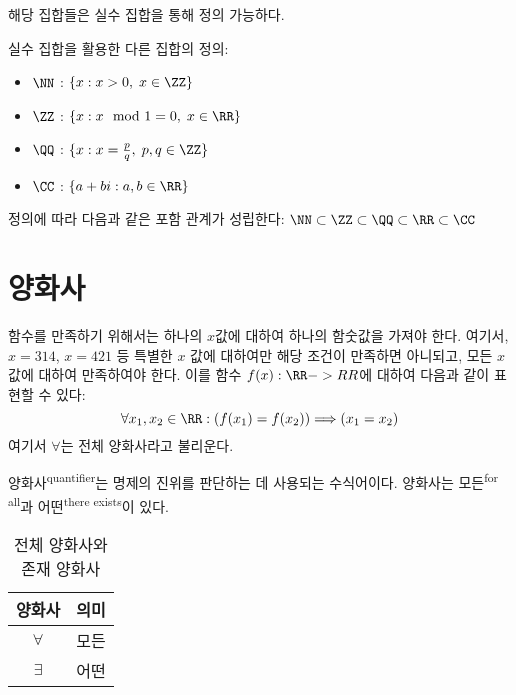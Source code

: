 \documentclass[../note.tex]{subfiles}
\begin{document}
해당 집합들은 실수 집합을 통해 정의 가능하다.

\begin{definition}
  실수 집합을 활용한 다른 집합의 정의:
  \begin{itemize}
    \item
      $\NN$ : $\{x : x > 0,\; x \in \ZZ\}$
    \item
      $\ZZ$ : $\{x : x \mod 1 = 0,\; x \in \RR\}$
    \item
      $\QQ$ : $\{x : x = \frac{p}{q},\; p, q \in \ZZ\}$
    \item
      $\CC$ : $\{a+bi : a, b \in \RR\}$
  \end{itemize}
\end{definition}

정의에 따라 다음과 같은 포함 관계가 성립한다: $\NN \subset \ZZ \subset \QQ \subset \RR \subset \CC$

\section{양화사}
함수를 만족하기 위해서는 하나의 $x$값에 대하여 하나의 함숫값을 가져야 한다. 여기서, $x = 314$, $x = 421$ 등 특별한 $x$ 값에 대하여만 해당 조건이 만족하면 아니되고, 모든 $x$ 값에 대하여 만족하여야 한다. 이를 함수 $f(x):\RR->RR$에 대하여 다음과 같이 표현할 수 있다:
\begin{equation}
  \forall x_1, x_2 \in \RR : \left( f(x_1) = f(x_2) \right) \Longrightarrow \left( x_1 = x_2 \right)
\end{equation}
여기서 $\forall$는 전체 양화사라고 불리운다.

\begin{definition}[양화사]
  양화사\textsuperscript{quantifier}는 명제의 진위를 판단하는 데 사용되는 수식어이다. 양화사는 모든\textsuperscript{for all}과 어떤\textsuperscript{there exists}이 있다.
  \begin{table}[H]
    \centering
    \begin{tabular}{ c c }
      양화사 & 의미 \\
      \hline
      $\forall$\index{전체 양화사} & 모든 \\
      $\exists$\index{존재 양화사} & 어떤 \\
    \end{tabular}
    \caption{전체 양화사와 존재 양화사}
  \end{table}
\end{definition}
\end{document}

